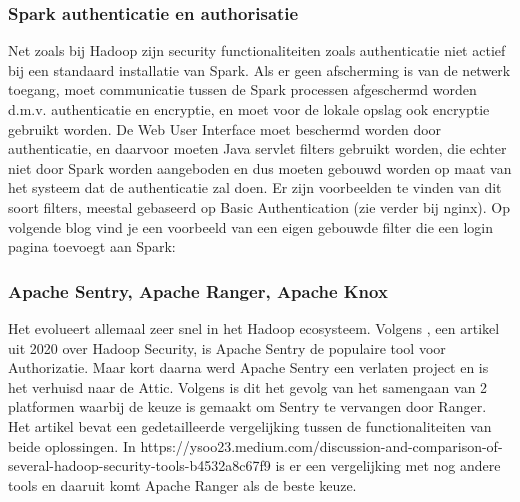 \subsubsection {Spark authenticatie en authorisatie} \autocite{Spark2023c}
Net zoals bij Hadoop zijn security functionaliteiten zoals authenticatie niet actief bij een standaard installatie van Spark. Als er geen afscherming is van de netwerk toegang, moet communicatie tussen de Spark processen afgeschermd worden d.m.v. authenticatie en encryptie, en moet voor de lokale opslag ook encryptie gebruikt worden. De Web User Interface moet beschermd worden door authenticatie, en daarvoor moeten Java servlet filters gebruikt worden, die echter niet door Spark worden aangeboden en dus moeten gebouwd worden op maat van het systeem dat de authenticatie zal doen.
Er zijn voorbeelden te vinden van dit soort filters, meestal gebaseerd op Basic Authentication (zie verder bij nginx). Op volgende blog vind je een voorbeeld van een eigen gebouwde filter die een login pagina toevoegt aan Spark: \textcite{Cacoveanu2019}
\newline
\newline


\subsubsection{Apache Sentry, Apache Ranger, Apache Knox}
Het evolueert allemaal zeer snel in het Hadoop ecosysteem. Volgens \textcite{Chu2020}, een artikel uit 2020 over Hadoop Security, is Apache Sentry de populaire tool voor Authorizatie. Maar kort daarna werd Apache Sentry een verlaten project en is het verhuisd naar de Attic.
\newline
Volgens \textcite{Anand2021} is dit het gevolg van het samengaan van 2 platformen waarbij de keuze is gemaakt om Sentry te vervangen door Ranger. Het artikel bevat een gedetailleerde vergelijking tussen de functionaliteiten van beide oplossingen.
\newline
In https://ysoo23.medium.com/discussion-and-comparison-of-several-hadoop-security-tools-b4532a8c67f9 is er een vergelijking met nog andere tools en daaruit komt Apache Ranger als de beste keuze.


